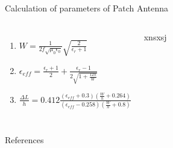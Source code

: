 \documentclass{beamer}
\begin{document}

\begin{frame}{Calculation of parameters of Patch Antenna}
  \begin{columns}
      \begin{enumerate}
        \item <1->\(W = \frac{1}{2f\sqrt{\mu_0\epsilon_0}}\sqrt{\frac{2}{\epsilon_r+1}}\)
        \item <2-> \(\epsilon_{eff} = \frac{\epsilon_r+1}{2} + \frac{\epsilon_r - 1}{2\sqrt{1+\frac{12h}{W}}}\)
        \item <3-> \(\frac{\Delta L}{h} = 0.412\frac{(\epsilon_{eff} + 0.3)\left(\frac{W}{h} + 0.264\right)}{(\epsilon_{eff} - 0.258)\left(\frac{W}{h} + 0.8\right)}\)
      \end{enumerate}
    xnsxsj
  \end{columns}
\end{frame}

\begin{frame}[allowframebreaks]{References}
  \nocite{*}
  
  
\end{frame} 
\end{document}
